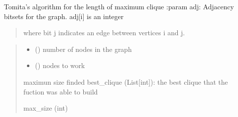 \documentclass[letterpaper,10pt,english]{sphinxmanual}
\begin{document}
\begin{fulllineitems}
\label{\detokenize{index:hammindist.functions.max_clique_tomita}}
\pysigstartsignatures
\pysiglinewithargsret
{}
{\sphinxparamcomma {}\sphinxparamcomma {}\sphinxparamcomma {}}
{}
\pysigstopsignatures
\sphinxAtStartPar
Tomita’s algorithm for the length of maximum clique
:param adj: Adjacency bitsets for the graph. adj{[}i{]} is an integer
\begin{quote}

\sphinxAtStartPar
where bit j indicates an edge between vertices i and j.
\end{quote}
\begin{quote}\begin{description}
\begin{itemize}
\item {} 
\sphinxAtStartPar
{} () \textendash{} number of nodes in the graph

\item {} 
\sphinxAtStartPar
{} (\sphinxstyleliteralemphasis{\sphinxupquote{{[}}}\sphinxstyleliteralemphasis{\sphinxupquote{{]}}}) \textendash{} nodes to work

\end{itemize}

\sphinxAtStartPar
maximun size finded
best\_clique (List{[}int{]}): the best clique that the fuction was able to build

\sphinxAtStartPar
max\_size (int)

\end{description}\end{quote}

\end{fulllineitems}

\end{document}

